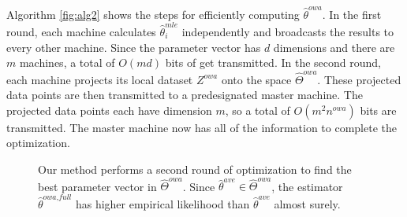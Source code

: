 \documentclass[twoside]{article}
\newcommand{\Zreopt}{Z^{\textit{owa}}}
\newcommand{\nreopt}{n^{\textit{owa}}}
\newcommand{\W}{{\hat \Theta^{\textit{owa}}}}
\newcommand{\E}{\mathbb{E}}
\newcommand{\x}{\mathbf{x}}
\newcommand{\w}{\theta}
\newcommand{\wreopt}{\hat\w^{owa}}
\newcommand{\wreoptfull}{\hat\w^{\textit{owa,full}}}
\newcommand{\wave}{\hat\w^{ave}}
\newcommand{\wmle}{\hat\w^{mle}}
\newcommand{\trans}[1]{\ensuremath{{#1}^{\mathsf{T}}}}
\begin{document}
Algorithm \ref{fig:alg2} shows the steps for efficiently computing $\wreopt$.
In the first round, each machine calculates $\wmle_i$ independently and broadcasts the results to every other machine.
Since the parameter vector has $d$ dimensions and there are $m$ machines, a total of $O(md)$ bits of get transmitted.
In the second round, each machine projects its local dataset $\Zreopt$ onto the space $\W$.
These projected data points are then transmitted to a predesignated master machine.
The projected data points each have dimension $m$, so a total of $O(m^2\nreopt)$ bits are transmitted.
The master machine now has all of the information to complete the optimization.

\begin{figure}
\hspace{-0.1in}
\caption{
    Our method performs a second round of optimization to find the best parameter vector in $\W$.
    Since $\wave\in\W$, the estimator $\wreoptfull$ has higher empirical likelihood than $\wave$ almost surely.
}
\label{fig:contour}
\end{figure}
\end{document}
